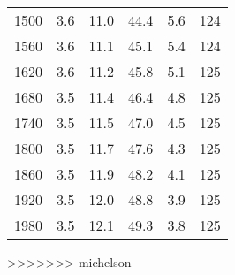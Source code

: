 \begin{table}[H]
\begin{tabular}{S S S S S S}
    1500 & 3.6 & 11.0 & 44.4 & 5.6 & 124 \\
    1560 & 3.6 & 11.1 & 45.1 & 5.4 & 124 \\
    1620 & 3.6 & 11.2 & 45.8 & 5.1 & 125 \\
    1680 & 3.5 & 11.4 & 46.4 & 4.8 & 125 \\
    1740 & 3.5 & 11.5 & 47.0 & 4.5 & 125 \\
    1800 & 3.5 & 11.7 & 47.6 & 4.3 & 125 \\
    1860 & 3.5 & 11.9 & 48.2 & 4.1 & 125 \\
    1920 & 3.5 & 12.0 & 48.8 & 3.9 & 125 \\
    1980 & 3.5 & 12.1 & 49.3 & 3.8 & 125 \\

      \bottomrule
    \end{tabular}
\end{table}
>>>>>>> michelson
